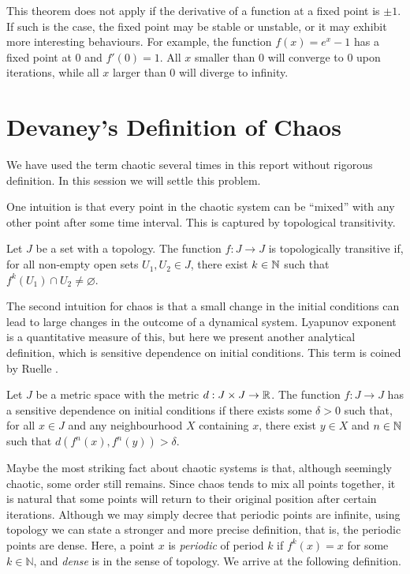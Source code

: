 This theorem does not apply if the derivative of a function at a fixed point is $\pm 1$.
If such is the case, the fixed point may be stable or unstable, or it may exhibit more interesting behaviours.
For example, the function $f(x) = e^x - 1$ has a fixed point at $0$ and $f'(0) = 1$.
All $x$ smaller than $0$ will converge to $0$ upon iterations, while all $x$ larger than $0$ will diverge to infinity.

\section{Devaney's Definition of Chaos}

We have used the term chaotic several times in this report without rigorous definition. 
In this session we will settle this problem.

One intuition is that every point in the chaotic system can be ``mixed'' with any other point after some time interval. 
This is captured by topological transitivity.
\begin{defn}
	Let $J$ be a set with a topology.
	The function $f: J \rightarrow J$ is topologically transitive if, for all non-empty open sets $U_1, U_2 \in J$, there exist $k \in \mathbb{N}$ such that $f^k(U_1) \cap U_2 \neq \varnothing$. 
\end{defn}

The second intuition for chaos is that a small change in the initial conditions can lead to large changes in the outcome of a dynamical system. 
Lyapunov exponent is a quantitative measure of this, but here we present another analytical definition, which is sensitive dependence on initial conditions. This term is coined by Ruelle \cite{Ruelle-1978}.
\begin{defn}
	Let $J$ be a metric space with the metric $d: J \times J \rightarrow \mathbb{R}$. The function
	$f: J \rightarrow J$ has a sensitive dependence on initial conditions if there exists some $\delta > 0$ such that, for all $x \in J$ and any neighbourhood $X$ containing $x$, there exist $y \in X$ and $n \in \mathbb{N}$ such that $d(f^n(x), f^n(y)) > \delta$.
\end{defn}

Maybe the most striking fact about chaotic systems is that, although seemingly chaotic, some order still remains.
Since chaos tends to mix all points together, it is natural that some points will return to their original position after certain iterations.
Although we may simply decree that periodic points are infinite, using topology we can state a stronger and more precise definition, that is, the periodic points are dense. Here, a point $x$ is \textit{periodic} of period $k$ if $f^k(x)=x$ for some $k\in\mathbb{N}$, and \textit{dense} is in the sense of topology. We arrive at the following definition.

